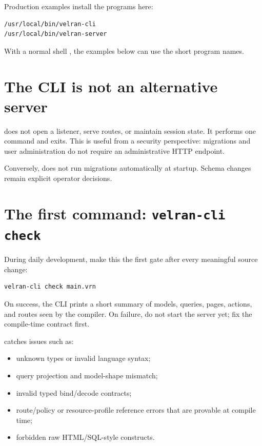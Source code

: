 Production examples install the programs here:

\begin{lstlisting}
/usr/local/bin/velran-cli
/usr/local/bin/velran-server
\end{lstlisting}

With a normal shell , the examples below can use the short program names.

\section{The CLI is not an alternative server}

 does not open a listener, serve routes, or maintain session state. It performs one command and exits. This is useful from a security perspective: migrations and user administration do not require an administrative HTTP endpoint.

Conversely,  does not run migrations automatically at startup. Schema changes remain explicit operator decisions.

\section{The first command: \texttt{velran-cli check}}

During daily development, make this the first gate after every meaningful source change:

\begin{lstlisting}
velran-cli check main.vrn
\end{lstlisting}

On success, the CLI prints a short summary of models, queries, pages, actions, and routes seen by the compiler. On failure, do not start the server yet; fix the compile-time contract first.

 catches issues such as:

\begin{itemize}
  \item unknown types or invalid language syntax;
  \item query projection and model-shape mismatch;
  \item invalid typed bind/decode contracts;
  \item route/policy or resource-profile reference errors that are provable at compile time;
  \item forbidden raw HTML/SQL-style constructs.
\end{itemize}

